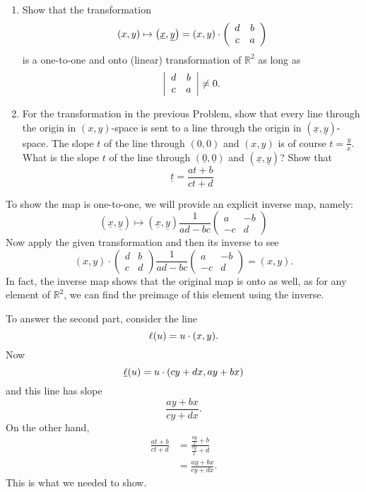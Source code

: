 \documentclass{ximera}
\begin{document}
\begin{problem}\hfil
\begin{enumerate}
\item Show that the transformation%
\[
\left(  x,y\right)  \mapsto\left(  \underline{x},\underline{y}\right)
=\left(  x,y\right)  \cdot\left(
\begin{array}
[c]{cc}%
d & b\\
c & a
\end{array}
\right)
\]
is a one-to-one and onto (linear) transformation of $\mathbb{R}^{2}$ as long as
\begin{equation}
\left\vert
\begin{array}
[c]{cc}%
d & b\\
c & a
\end{array}
\right\vert \neq0. \label{52}%
\end{equation}

\item For the transformation in the previous Problem, show that every line through the origin in $\left( x,y\right) $-space is sent to a line
through the origin in $\left( \underline{x},\underline{y}\right)
$-space. The slope $t$ of the line through $\left( 0,0\right) $ and
$\left( x,y\right) $ is of course $t=\frac{y}{x}$. What is the
slope \underline{$t$} of the line through
$\left( \underline{0},\underline{0}\right) $ and $\left(
\underline{x},\underline{y}\right)  $? Show that%
\begin{equation}
\underline{t}=\frac{at+b}{ct+d} \label{41}%
\end{equation}
\end{enumerate}
\begin{freeResponse}
To show the map is one-to-one, we will provide an explicit inverse
map, namely:
\[
\left(  \underline{x},\underline{y}\right)\mapsto \left(  \underline{x},\underline{y}\right) 
\frac{1}{ad-bc}\begin{pmatrix}
a &-b \\
-c& d
\end{pmatrix}
\]
Now apply the given transformation and then its inverse to see
\[
(x,y) \cdot \begin{pmatrix}
d & b \\
c & d
\end{pmatrix}\frac{1}{ad-bc}\begin{pmatrix}
a &-b \\
-c& d
\end{pmatrix} = (x,y).
\]
In fact, the inverse map shows that the original map is onto as well,
 as for any element of $\mathbb{R}^2$, we can find the preimage of
 this element using the inverse.  

To answer the second part, consider the line
\[
\ell(u) = u\cdot (x,y).
\]
Now 
\[
\underline{\ell}(u) = u\cdot (cy+dx,ay+bx)
\]
and this line has slope
\[
\frac{ay+bx}{cy+dx}.
\]
On the other hand, 
\begin{align*}
\frac{at+b}{ct+d} &= \frac{\frac{ay}{x} + b}{\frac{cy}{x}+d} \\
&= \frac{ay+bx}{cy+dx}.
\end{align*}
This is what we needed to show.
\end{freeResponse}
\end{problem}
\end{document}
